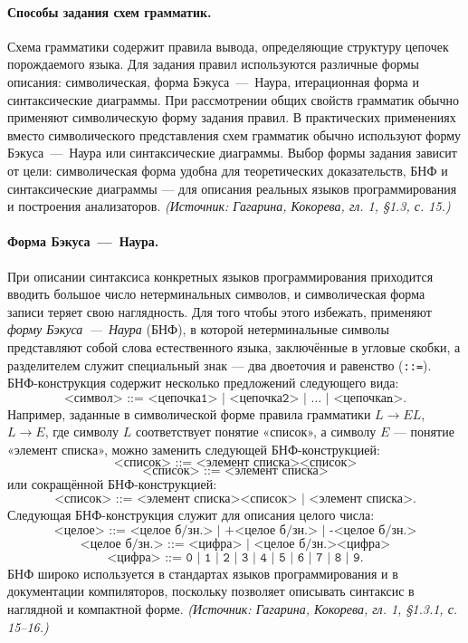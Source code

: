 \documentclass[a4paper,12pt]{article}
\begin{document}
\paragraph{Способы задания схем грамматик.}
Схема грамматики содержит правила вывода, определяющие структуру цепочек порождаемого языка. Для задания правил используются различные формы описания: символическая, форма Бэкуса~—~Наура, итерационная форма и синтаксические диаграммы. При рассмотрении общих свойств грамматик обычно применяют символическую форму задания правил. В практических применениях вместо символического представления схем грамматик обычно используют форму Бэкуса~—~Наура или синтаксические диаграммы. Выбор формы задания зависит от цели: символическая форма удобна для теоретических доказательств, БНФ и синтаксические диаграммы — для описания реальных языков программирования и построения анализаторов.
\textit{(Источник: Гагарина, Кокорева, гл. 1, §1.3, с. 15.)}

\paragraph{Форма Бэкуса~—~Наура.}
При описании синтаксиса конкретных языков программирования приходится вводить большое число нетерминальных символов, и символическая форма записи теряет свою наглядность. Для того чтобы этого избежать, применяют \emph{форму Бэкуса~—~Наура} (БНФ), в которой нетерминальные символы представляют собой слова естественного языка, заключённые в угловые скобки, а разделителем служит специальный знак — два двоеточия и равенство (\texttt{::=}). БНФ-конструкция содержит несколько предложений следующего вида:
\[
\texttt{<символ> ::= <цепочка1> | <цепочка2> | ... | <цепочкаn>}.
\]
Например, заданные в символической форме правила грамматики \(L\to EL\), \(L\to E\), где символу \(L\) соответствует понятие «список», а символу \(E\) — понятие «элемент списка», можно заменить следующей БНФ-конструкцией:
\[
\texttt{<список> ::= <элемент списка><список>}
\]
\[
\texttt{<список> ::= <элемент списка>}
\]
или сокращённой БНФ-конструкцией:
\[
\texttt{<список> ::= <элемент списка><список> | <элемент списка>}.
\]
Следующая БНФ-конструкция служит для описания целого числа:
\[
\texttt{<целое> ::= <целое б/зн.> | +<целое б/зн.> | -<целое б/зн.>}
\]
\[
\texttt{<целое б/зн.> ::= <цифра> | <целое б/зн.><цифра>}
\]
\[
\texttt{<цифра> ::= 0 | 1 | 2 | 3 | 4 | 5 | 6 | 7 | 8 | 9}.
\]
БНФ широко используется в стандартах языков программирования и в документации компиляторов, поскольку позволяет описывать синтаксис в наглядной и компактной форме.
\textit{(Источник: Гагарина, Кокорева, гл. 1, §1.3.1, с. 15--16.)}
\end{document}

